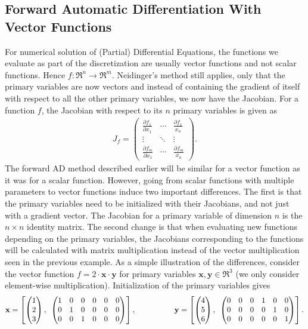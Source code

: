 \subsection{Forward Automatic Differentiation With Vector Functions}
\label{sec:FADWithVectorParameters}
For numerical solution of (Partial) Differential Equations, the functions we evaluate as part of the discretization are usually vector functions and not scalar functions. Hence $f: \Re^n \rightarrow \Re^m$. Neidinger's method still applies, only that the primary variables are now vectors and instead of containing the gradient of itself with respect to all the other primary variables, we now have the Jacobian. For a function $f$, the Jacobian with respect to its $n$ primary variables is given as
\begin{align*}
    J_f  =
    \begin{pmatrix}
        \frac{\partial f_1}{\partial x_1} & \dotsb & \frac{\partial f_1}{x_n}\\
        \vdots & \ddots & \vdots \\
        \frac{\partial f_m}{\partial x_1} & \dotsb & \frac{\partial f_m}{x_n}
    \end{pmatrix}.
\end{align*}
The forward AD method described earlier will be similar for a vector function as it was for a scalar function. However, going from scalar functions with multiple parameters to vector functions induce two important differences. The first is that the primary variables need to be initialized with their Jacobians, and not just with a gradient vector. The Jacobian for a primary variable of dimension $n$ is the $n \times n$ identity matrix. The second change is that when evaluating new functions depending on the primary variables, the Jacobians corresponding to the functions will be calculated with matrix multiplication instead of the vector multiplication seen in the previous example. As a simple illustration of the differences, consider the vector function $f = 2\cdot \textbf{x}\cdot \textbf{y}$ for primary variables $\textbf{x},\textbf{y}\in \Re^3$ (we only consider element-wise multiplication). Initialization of the primary variables gives
\begin{equation}
    \label{def:VectorAD}
    \textbf{x} = \left[\begin{pmatrix}1\\2\\3
    \end{pmatrix},\hspace{0.5em}\begin{pmatrix}
    1&0&0&0&0&0\\
    0&1&0&0&0&0\\
    0&0&1&0&0&0\end{pmatrix} \right],
    \hspace{5em}
    \textbf{y} = \left[\begin{pmatrix}4\\5\\6
    \end{pmatrix},\hspace{0.5em}\begin{pmatrix}
    0&0&0&1&0&0\\
    0&0&0&0&1&0\\
    0&0&0&0&0&1\end{pmatrix} \right].
\end{equation}
